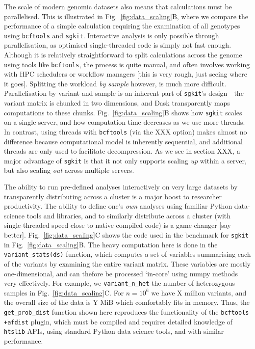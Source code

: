 \documentclass[9pt,lineno]{elife}
\newcommand{\toolname}[1]{\texttt{#1}}
\begin{document}
The scale of modern genomic datasets also means that calculations must
be parallelised. This is illustrated in Fig.~\ref{fig:data_scaling}B,
where we compare the performance of a simple calculation requiring
the examination of all genotypes using \toolname{bcftools}
and \texttt{sgkit}. Interactive analysis is only possible through
parallelisation, as optimised single-threaded code
is simply not fast enough.
Although it is relatively straightforward to split calculations across
the genome using tools like \toolname{bcftools}, the process
is quite manual, and often involves working with HPC schedulers
or workflow managers [this is very rough, just seeing where it goes].
Splitting the workload \emph{by sample} however, is much more
difficult. Parallelisation by variant and sample is an inherent
part of \texttt{sgkit}'s design---the variant matrix is chunked
in two dimensions, and Dask transparently maps computations to these
chunks.
Fig.~\ref{fig:data_scaling}B shows how \texttt{sgkit} scales
on a single server, and how computation time decreases as we use
more threads. In contrast, using threads with
\toolname{bcftools} (via the XXX option) makes almost no difference
because computational model is inherently sequential, and additional threads
are only used to facilitate decompression.
As we see in section XXX,
a major advantage of \texttt{sgkit} is that it not only supports
scaling \emph{up} within a server, but also scaling \emph{out}
across multiple servers.

The ability to
run pre-defined analyses interactively on very large datasets by
transparently distributing across a cluster is a major boost to
researcher productivity. The ability to define one's \emph{own}
analyses using familiar Python data-science tools and libraries,
and to similarly distribute across a cluster (with single-threaded
speed close to native compiled code) is a game-changer [say better].
Fig.~\ref{fig:data_scaling}C shows the code used in the benchmark
for \toolname{sgkit} in Fig.~\ref{fig:data_scaling}B. The heavy
computation here is done in the \texttt{variant\_stats(ds)} function,
which computes a set of variables summarising each of the variants
by examining the entire variant matrix.
These variables are mostly one-dimensional, and can thefore
be processed `in-core' using numpy methods very effectively.
For example, we \texttt{variant\_n\_het} the number of heterozygous samples
in Fig.~\ref{fig:data_scaling}C. For $n=10^6$ we have X million
variants, and the overall size of the data is Y MiB which
comfortably fits in memory. Thus, the
\texttt{get\_prob\_dist} function shown here reproduces the functionality
of the \toolname{bcftools +afdist} plugin, which must be compiled and
requires detailed knowledge of \toolname{htslib} APIs, using standard
Python data science tools, and with similar performance.
\end{document}
